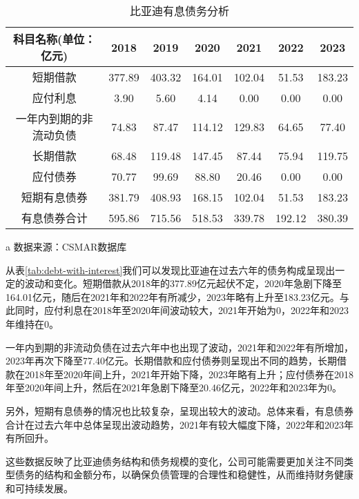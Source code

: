 \begin{table}
  \centering
  \begin{threeparttable}[c]
    \caption{比亚迪有息债务分析}
    \label{tab:debt-with-interest}
    \begin{tabular}{ccccccc}
      \toprule
        科目名称(单位：亿元) & 2018 & 2019 & 2020 & 2021 & 2022 & 2023 \\
      \midrule
        短期借款 & 377.89  & 403.32  & 164.01  & 102.04  & 51.53  & 183.23  \\
        应付利息 & 3.90  & 5.60  & 4.14  & 0.00  & 0.00  & 0.00  \\
        一年内到期的非流动负债 & 74.83  & 87.47  & 114.12  & 129.83  & 64.65  & 77.40  \\
        长期借款 & 68.48  & 119.48  & 147.45  & 87.44  & 75.94  & 119.75  \\
        应付债券 & 70.77  & 99.69  & 88.80  & 20.46  & 0.00  & 0.00  \\
        短期有息债券 & 381.79  & 408.93  & 168.15  & 102.04  & 51.53  & 183.23  \\
        有息债券合计 & 595.86  & 715.56  & 518.53  & 339.78  & 192.12  & 380.39 \\
      \bottomrule
    \end{tabular}
    \begin{tablenotes}
      \item [a] 数据来源：CSMAR数据库
    \end{tablenotes}
  \end{threeparttable}
\end{table}
从表\eqref{tab:debt-with-interest}我们可以发现比亚迪在过去六年的债务构成呈现出一定的波动和变化。短期借款从2018年的377.89亿元起伏不定，2020年急剧下降至164.01亿元，随后在2021年和2022年有所减少，2023年略有上升至183.23亿元。与此同时，应付利息在2018年至2020年间波动较大，2021年开始为0，2022年和2023年维持在0。

一年内到期的非流动负债在过去六年中也出现了波动，2021年和2022年有所增加，2023年再次下降至77.40亿元。长期借款和应付债券则呈现出不同的趋势，长期借款在2018年至2020年间上升，2021年开始下降，2023年略有上升；应付债券在2018年至2020年间上升，然后在2021年急剧下降至20.46亿元，2022年和2023年为0。

另外，短期有息债券的情况也比较复杂，呈现出较大的波动。总体来看，有息债券合计在过去六年中总体呈现出波动趋势，2021年有较大幅度下降，2022年和2023年有所回升。

这些数据反映了比亚迪债务结构和债务规模的变化，公司可能需要更加关注不同类型债务的结构和金额分布，以确保负债管理的合理性和稳健性，从而维持财务健康和可持续发展。
